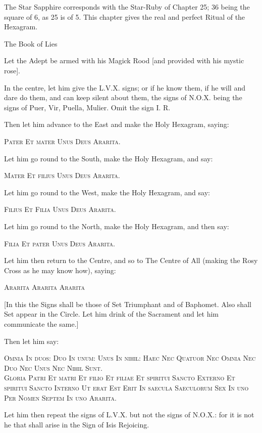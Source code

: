 
\epigraph{The Star Sapphire corresponds with the Star-Ruby of Chapter 25; 36 being the square of 6, as 25 is of 5. This chapter gives the real and perfect Ritual of the Hexagram.}{The Book of Lies}


Let the Adept be armed with his Magick Rood [and provided with his mystic rose].

In the centre, let him give the L.V.X. signs; or if he know them, if he will and dare do them, and can keep silent about them, the signs of N.O.X. being the signs of Puer, Vir, Puella, Mulier. Omit the sign I. R.

Then let him advance to the East and make the Holy Hexagram, saying:


\begin{quoting}[indentfirst=false]
\textsc{Pater Et mater Unus Deus Ararita.}
\end{quoting}

Let him go round to the South, make the Holy Hexagram, and say: 

\begin{quoting}[indentfirst=false]
\textsc{Mater Et filius Unus Deus Ararita.}
\end{quoting}

Let him go round to the West, make the Holy Hexagram, and say:

\begin{quoting}[indentfirst=false]
\textsc{Filius Et Filia Unus Deus Ararita.}
\end{quoting}

Let him go round to the North, make the Holy Hexagram, and then say:

\begin{quoting}[indentfirst=false]
\textsc{Filia Et pater Unus Deus Ararita.}
\end{quoting}

Let him then return to the Centre, and so to The Centre of All (making the Rosy Cross as he may know how), saying:

\begin{quoting}[indentfirst=false]
\textsc{Ararita Ararita Ararita}
\end{quoting}

[In this the Signs shall be those of Set Triumphant and of Baphomet. Also shall Set appear in the Circle. Let him drink of the Sacrament and let him communicate the same.]
 
Then let him say:

\begin{quoting}
\textsc{Omnia In duos: Duo In unum: Unus In nihil: Haec Nec Quatuor Nec Omnia Nec Duo Nec Unus Nec Nihil Sunt.}\\

\textsc{Gloria Patri Et matri Et filio Et filiae Et spiritui Sancto Externo Et spiritui Sancto Interno Ut erat Est Erit In saecula Saeculorum Sex In uno Per Nomen Septem In uno Ararita.}
\end{quoting}

Let him then repeat the signs of L.V.X. but not the signs of N.O.X.: for it is not he that shall arise in the Sign of Isis Rejoicing.
